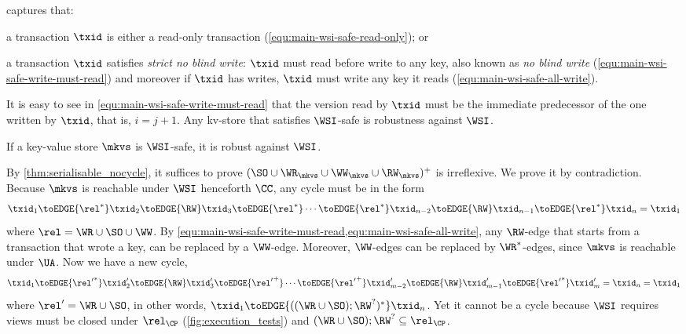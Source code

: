  captures that:
\begin{enumerate*} 
    \item a transaction \( \txid \) is either a read-only transaction (\cref{equ:main-wsi-safe-read-only}); or
    \item a transaction \( \txid \) satisfies \emph{strict no blind write}: 
        \( \txid \) must read before write to any key, also known as \emph{no blind write} (\cref{equ:main-wsi-safe-write-must-read}) 
        and moreover if \( \txid \) has writes, \( \txid \) must write any key it reads (\cref{equ:main-wsi-safe-all-write}).
\end{enumerate*}
It is easy to see in \cref{equ:main-wsi-safe-write-must-read} that 
the version read by \( \txid \) must be the immediate predecessor of the one written by \( \txid \),
that is, \( i = j + 1 \).
Any kv-store that satisfies \( \WSI \)-safe is robustness against \( \WSI \).

\begin{theorem}
    If a key-value store \( \mkvs \) is \(\WSI\)-safe, it is robust against \(\WSI\).
\end{theorem}

\noindent By \cref{thm:serialisable_nocycle}, 
it suffices to prove $(\SO \cup \WR_{\mkvs} \cup \WW_{\mkvs} \cup \RW_{\mkvs})^{+}$ is irreflexive.
We prove it by contradiction.
Because \( \mkvs \) is reachable under \( \WSI \) henceforth \( \CC \),
any cycle must be in the form
\[
    \txid_1 \toEDGE{\rel^*} \txid_2 \toEDGE{\RW} \txid_3 \toEDGE{\rel^*} \cdots \toEDGE{\rel^*} \txid_{n-2} \toEDGE{\RW} \txid_{n-1} \toEDGE{\rel^*} \txid_n = \txid_1
\]
\noindent where \( \rel = \WR \cup \SO \cup \WW \).
By \cref{equ:main-wsi-safe-write-must-read,equ:main-wsi-safe-all-write}, 
any \( \RW \)-edge that starts from a transaction that wrote a key, can be replaced by a \( \WW \)-edge.
Moreover, \( \WW \)-edges can be replaced by \( \WR^* \)-edges, since \( \mkvs \) is reachable under \( \UA \).
Now we have a new cycle,
\[
    \txid_1 \toEDGE{{\rel'}^*} \txid'_2 \toEDGE{\RW} \txid'_3 \toEDGE{{\rel'}^+} \cdots \toEDGE{{\rel'}^+} \txid'_{m-2} \toEDGE{\RW} \txid'_{m-1} \toEDGE{{\rel'}^*} \txid'_m = \txid_n = \txid_1
\]
\noindent where \( \rel' = \WR \cup \SO \), in other words, \( \txid_1 \toEDGE{( (\WR \cup \SO); \RW^? )^* } \txid_n \).
Yet it cannot be a cycle because \( \WSI \) requires views must be closed under \( \rel_\CP \) (\cref{fig:execution_tests}) and \( (\WR \cup \SO); \RW^? \subseteq \rel_\CP \).


